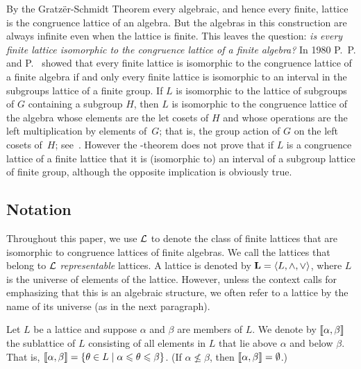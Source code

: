 By the Gratz\"er-Schmidt Theorem every algebraic, and hence
every finite, lattice is the congruence lattice of an algebra. 
But the algebras in this construction are always infinite
even when the lattice is finite. This leaves the question:
\emph{is every finite lattice isomorphic to the congruence
lattice of a finite algebra?} In 1980 P.~P. \Palfy and P.~\Pudlak
showed that every finite lattice is isomorphic to the congruence
lattice of a finite algebra if and only every finite lattice is
isomorphic to an interval in the subgroups lattice of a finite 
group. If $L$ is isomorphic to the lattice of subgroups of $G$
containing a subgroup $H$, then $L$ is isomorphic to the congruence
lattice of the algebra whose elements are the let cosets of $H$
and whose operations are the left multiplication by elements of~$G$;
that is, the group action of $G$ on the left cosets of~$H$;
see~\cite{alvi:1987}.
However the \Palfy-\Pudlak theorem does not prove that if $L$
is a congruence lattice of a finite lattice that it 
is (isomorphic to) an interval of a subgroup lattice of finite
group, although the opposite implication is obviously true.









\subsection{Notation}

Throughout this paper, we use $\mathcal{L}$ to denote the class of finite lattices that
are isomorphic to congruence lattices of finite algebras. 
We call the lattices that belong to $\mathcal{L}$ \emph{representable} lattices.
A lattice is denoted by $\mathbf{L} = \langle L, \wedge, \vee\rangle$, where $L$
is the universe of elements of the lattice.  However, unless the context
calls for emphasizing that this is an algebraic structure, we often
refer to a lattice by the name of its universe (as in the next paragraph).

Let $L$ be a lattice and suppose $\alpha$ and $\beta$ are members of $L$.  
We denote by $\llbracket \alpha, \beta \rrbracket$ the sublattice of $L$ consisting of all
elements in $L$ that lie above $\alpha$ and below $\beta$.  
That is, 
$\llbracket \alpha, \beta \rrbracket = 
\{\theta \in L \mid \alpha \leqslant \theta \leqslant \beta\}$.
(If $\alpha \nleq \beta$, then $\llbracket \alpha, \beta \rrbracket = \emptyset$.)

